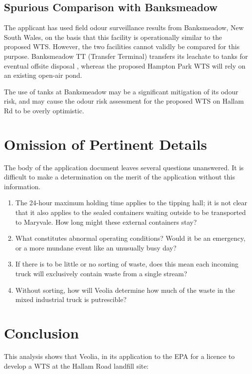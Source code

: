 \documentclass[12pt]{article}
\begin{document}
\subsection{Spurious Comparison with Banksmeadow}

The applicant has used field odour surveillance results from Banksmeadow, New South Wales, on the basis that this facility is operationally similar to the proposed WTS. However, the two facilities cannot validly be compared for this purpose. Banksmeadow TT (Transfer Terminal) transfers its leachate to tanks for eventual offsite disposal \cite{banksmeadow}, whereas the proposed Hampton Park WTS will rely on an existing open-air pond. 

The use of tanks at Banksmeadow may be a significant mitigation of its odour risk, and may cause the odour risk assessment for the proposed WTS on Hallam Rd to be overly optimistic. 

\section{Omission of Pertinent Details}

The body of the application document leaves several questions unanswered. It is difficult to make a determination on the merit of the application without this information.

\begin{enumerate}
  \item The 24-hour maximum holding time applies to the tipping hall; it is not clear that it also applies to the sealed containers waiting outside to be transported to Maryvale. How long might these external containers stay? 
  \item What constitutes abnormal operating conditions? Would it be an emergency, or a more mundane event like an unusually busy day?
  \item If there is to be little or no sorting of waste, does this mean each incoming truck will exclusively contain waste from a single stream?
  \item Without sorting, how will Veolia determine how much of the waste in the mixed industrial truck is putrescible?
\end{enumerate}

\section*{Conclusion}

This analysis shows that Veolia, in its application to the EPA for a licence to develop a WTS at the Hallam Road landfill site:
\end{document}
